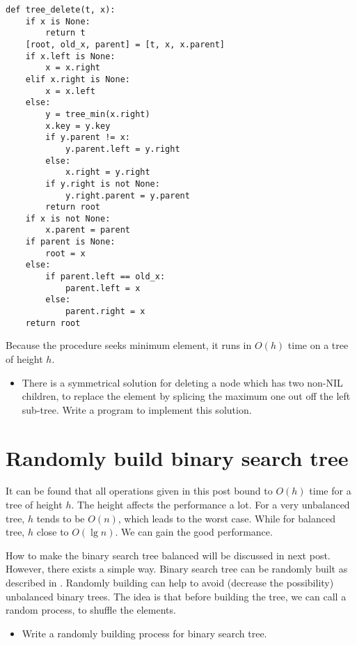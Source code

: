 \documentclass[b5paper]{article}
\begin{document}
\lstset{language=Python}
\begin{lstlisting}
def tree_delete(t, x):
    if x is None:
        return t
    [root, old_x, parent] = [t, x, x.parent]
    if x.left is None:
        x = x.right
    elif x.right is None:
        x = x.left
    else:
        y = tree_min(x.right)
        x.key = y.key
        if y.parent != x:
            y.parent.left = y.right
        else:
            x.right = y.right
        if y.right is not None:
            y.right.parent = y.parent
        return root
    if x is not None:
        x.parent = parent
    if parent is None:
        root = x
    else:
        if parent.left == old_x:
            parent.left = x
        else:
            parent.right = x
    return root
\end{lstlisting}

Because the procedure seeks minimum element, it runs in $O(h)$ time on
a tree of height $h$.

\begin{Exercise}

\begin{itemize}
\item There is a symmetrical solution for deleting a node which has two
non-NIL children, to replace the element by splicing the maximum one out
off the left sub-tree. Write a program to implement this solution.
\end{itemize}

\end{Exercise}

\section{Randomly build binary search tree}
It can be found that all operations given in this post bound to $O(h)$
time for a tree of height $h$. The height affects the performance
a lot. For a very unbalanced tree, $h$ tends to be $O(n)$, which leads
to the worst case. While for balanced tree, $h$ close to $O(\lg n)$.
We can gain the good performance.

How to make the binary search tree
balanced will be discussed in next post. However, there exists a simple
way. Binary search tree can be randomly built as described in \cite{CLRS}.
Randomly building can help to avoid (decrease the possibility) unbalanced
binary trees. The idea is that before building the tree, we can call a random
process, to shuffle the elements.

\begin{Exercise}

\begin{itemize}
\item Write a randomly building process for binary search tree.
\end{itemize}

\end{Exercise}
\end{document}
